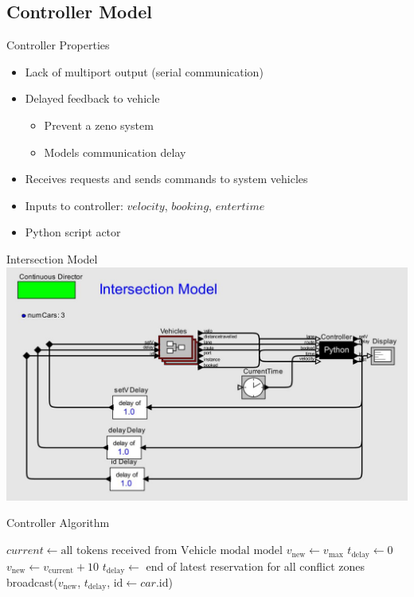 \subsection{Controller Model}

\begin{frame}{Controller Properties}
\begin{itemize}
\item Lack of multiport output (serial communication)
\item Delayed feedback to vehicle
\begin{itemize}
\item Prevent a zeno system
\item Models communication delay
\end{itemize}
\item Receives requests and sends commands to system vehicles
\item Inputs to controller: $velocity$, $booking$, $entertime$ 
\item Python script actor
\end{itemize}
\end{frame}

\begin{frame}{Intersection Model}
\centering\includegraphics[width=0.9\linewidth]{diagram/ptolemy_system.jpg}
\end{frame}

\begin{frame}{Controller Algorithm}
\scriptsize
\begin{algorithmic}

	\State $current \gets \text{all tokens received from Vehicle modal model}$
				\State $v_\text{new} \gets v_\text{max}$
				\State $t_\text{delay} \gets 0$
			\Else
				\State $v_\text{new} \gets v_\text{current} + 10$
				\State $t_\text{delay} \gets$ end of latest reservation for all conflict zones
			\EndIf
			\State broadcast($v_\text{new}$, $t_\text{delay}$,
					$\text{id} \gets car\text{.id}$)
		\EndIf
	\EndFor
\EndFor

\end{algorithmic}
\end{frame}
